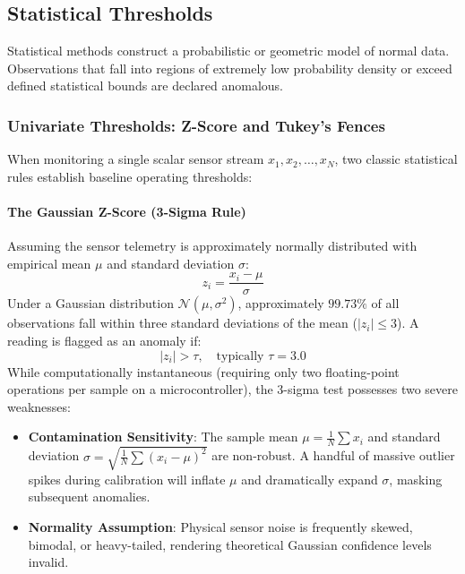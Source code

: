 \subsection{Statistical Thresholds}\label{subsec:statistical_thresholds}

Statistical methods construct a probabilistic or geometric model of normal data. Observations that fall into regions of extremely low probability density or exceed defined statistical bounds are declared anomalous.

\subsubsection{Univariate Thresholds: Z-Score and Tukey's Fences}

When monitoring a single scalar sensor stream $x_1, x_2, \dots, x_N$, two classic statistical rules establish baseline operating thresholds:

\paragraph{The Gaussian Z-Score (3-Sigma Rule)}
Assuming the sensor telemetry is approximately normally distributed with empirical mean $\mu$ and standard deviation $\sigma$:
\begin{equation}
z_i = \frac{x_i - \mu}{\sigma}\label{eq:z_score}
\end{equation}
Under a Gaussian distribution $\mathcal{N}(\mu, \sigma^2)$, approximately $99.73\%$ of all observations fall within three standard deviations of the mean ($|z_i| \le 3$). A reading is flagged as an anomaly if:
\begin{equation}
|z_i| > \tau, \quad \text{typically } \tau = 3.0\label{eq:three_sigma_test}
\end{equation}
While computationally instantaneous (requiring only two floating-point operations per sample on a microcontroller), the 3-sigma test possesses two severe weaknesses:
\begin{itemize}
    \item \textbf{Contamination Sensitivity}: The sample mean $\mu = \frac{1}{N}\sum x_i$ and standard deviation $\sigma = \sqrt{\frac{1}{N}\sum (x_i - \mu)^2}$ are non-robust. A handful of massive outlier spikes during calibration will inflate $\mu$ and dramatically expand $\sigma$, masking subsequent anomalies.
    \item \textbf{Normality Assumption}: Physical sensor noise is frequently skewed, bimodal, or heavy-tailed, rendering theoretical Gaussian confidence levels invalid.
\end{itemize}

